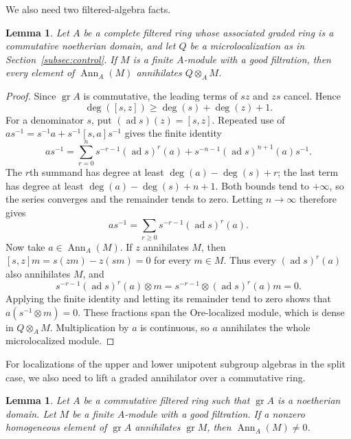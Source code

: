 \documentclass[11pt]{article}
\numberwithin{equation}{section}
\newtheorem{lemma}[theorem]{Lemma}
\theoremstyle{definition}
\theoremstyle{remark}
\DeclareMathOperator{\gr}{gr}
\DeclareMathOperator{\Ann}{Ann}
\begin{document}
We also need two filtered-algebra facts. 

\begin{lemma}\label{lem:microlocalized-annihilator}
Let $A$ be a complete filtered ring whose associated graded ring
is a commutative noetherian domain, and let $Q$ be a
microlocalization as in Section~\ref{subsec:control}.
If $M$ is a finite $A$-module with a good filtration, then
every element of $\Ann_{A}(M)$ annihilates
$Q\otimes_{A}M$.
\end{lemma}

\begin{proof}
Since $\gr A$ is commutative, the leading terms of $sz$ and $zs$
cancel. Hence
\[
 \deg([s,z])\geq\deg(s)+\deg(z)+1.
\]
For a denominator $s$, put $(\operatorname{ad}s)(z)=[s,z]$.
Repeated use of $as^{-1}=s^{-1}a+s^{-1}[s,a]s^{-1}$ gives the
finite identity
\[
 as^{-1}=\sum_{r=0}^{n}s^{-r-1}(\operatorname{ad}s)^r(a)
       +s^{-n-1}(\operatorname{ad}s)^{n+1}(a)s^{-1}.
\]
The $r$th summand has degree at least $\deg(a)-\deg(s)+r$;
the last term has degree at least $\deg(a)-\deg(s)+n+1$.
Both bounds tend to $+\infty$, so the series converges and the
remainder tends to zero. Letting $n\to\infty$ therefore gives
\begin{equation}\label{eq:annihilator-commutator-series}
 as^{-1}=\sum_{r\geq0}s^{-r-1}(\operatorname{ad}s)^r(a).
\end{equation}
Now take $a\in\Ann_{A}(M)$. If $z$ annihilates $M$, then
$[s,z]m=s(zm)-z(sm)=0$ for every $m\in M$.
Thus every $(\operatorname{ad}s)^r(a)$ also annihilates $M$, and
\[
 s^{-r-1}(\operatorname{ad}s)^r(a)\otimes m
 =s^{-r-1}\otimes(\operatorname{ad}s)^r(a)m=0.
\]
Applying the finite identity and letting its remainder tend to zero
shows that $a(s^{-1}\otimes m)=0$.
These fractions span the Ore-localized module, which is dense in
$Q\otimes_{A}M$. Multiplication by $a$ is continuous, so $a$
annihilates the whole microlocalized module.
\end{proof}

For localizations of the upper and lower unipotent subgroup
algebras in the split case, we also need to lift a graded
annihilator over a commutative ring.

\begin{lemma}\label{lem:commutative-filtered-annihilator}
Let $A$ be a commutative filtered ring such that
$\gr A$ is a noetherian domain. Let $M$ be a finite $A$-module
with a good filtration. If a nonzero homogeneous
element of $\gr A$ annihilates $\gr M$, then $\Ann_{A}(M)\ne0$.
\end{lemma}
\end{document}
